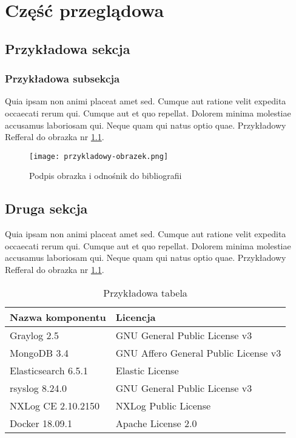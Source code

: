 \chapter{Część przeglądowa}

\section{Przykładowa sekcja}


\subsection{Przykładowa subsekcja}
Quia ipsam non animi placeat amet sed. Cumque aut ratione velit expedita occaecati rerum qui. Cumque aut et quo repellat. Dolorem minima molestiae accusamus laboriosam qui. Neque quam qui natus optio quae. Przykładowy Refferal do obrazka nr \ref{fig:przykladowy-obrazek}.

\begin{figure}[ht]
        \centering
        \texttt{[image: przykladowy-obrazek.png]}
        \caption{Podpis obrazka i odnośnik do bibliografii \cite{przykladowy-obrazek}}
        \label{fig:przykladowy-obrazek}
\end{figure}

\newpage

\section{Druga sekcja}
Quia ipsam non animi placeat amet sed. Cumque aut ratione velit expedita occaecati rerum qui. Cumque aut et quo repellat. Dolorem minima molestiae accusamus laboriosam qui. Neque quam qui natus optio quae. Przykładowy Refferal do obrazka nr \ref{table:przykladowa-tabela}.

\begin{table}[htb]
	\centering
	\caption{Przykładowa tabela}
	\label{table:przykladowa-tabela}

    \begin{tabular}{| l | l |}
    \hline
    Nazwa komponentu & Licencja \\ \hline
    Graylog 2.5 & GNU General Public License v3 \\ \hline
    MongoDB 3.4 & GNU Affero General Public License v3 \\ \hline
    Elasticsearch 6.5.1 & Elastic License \cite{elastic-license} \\ \hline
    rsyslog 8.24.0 & GNU General Public License v3  \\ \hline
    NXLog CE 2.10.2150& NXLog Public License  \\ \hline
    Docker 18.09.1 & Apache License 2.0  \\
    \hline
    \end{tabular}
\end{table}

\newpage